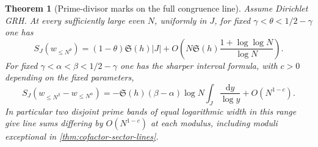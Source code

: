 \documentclass[11pt,a4paper]{article}
\numberwithin{equation}{section}
\newtheorem{theorem}{Theorem}[section]
\newcommand{\SSS}{\mathfrak S}
\newcommand{\ud}{\mathrm d}
\begin{document}
\begin{theorem}[Prime-divisor marks on the full congruence line]
\label{thm:cofactor-prime-marks}
Assume Dirichlet GRH. At every sufficiently large even $N$,
uniformly in $J$, for fixed $\gamma<\theta<1/2-\gamma$ one has
\begin{equation}
 S_J(w_{\le N^\theta})=(1-\theta)\SSS(h)|J|
       +O\left(N\SSS(h)\frac{1+\log\log N}{\log N}\right).
 \label{eq:cofactor-small-marks}
\end{equation}
For fixed $\gamma<\alpha<\beta<1/2-\gamma$ one has the sharper
interval formula, with $c>0$ depending on the fixed parameters,
\begin{equation}
 S_J(w_{\le N^\beta}-w_{\le N^\alpha})
 =-\SSS(h)(\beta-\alpha)\log N\int_J\frac{\ud y}{\log y}
       +O(N^{1-c}).
 \label{eq:cofactor-band-marks}
\end{equation}
In particular two disjoint prime bands of equal logarithmic width
in this range give line sums differing by $O(N^{1-c})$ at
each modulus, including moduli exceptional in
\cref{thm:cofactor-sector-lines}.
\end{theorem}
\end{document}
